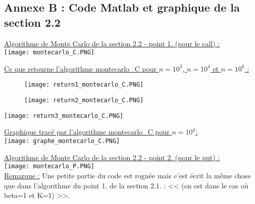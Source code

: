 \documentclass{article}
\theoremstyle{exostyle}
\begin{document}
\begin{appendices}

\setcounter{page}{1}
\section{Annexe B : Code Matlab et graphique de la section 2.2}

\bigbreak
\bigbreak

\hspace{-2.4cm}\underline{Algorithme de Monte Carlo de la section 2.2 - point 1. (pour le call) :}\\

\hspace{-2.5cm}\texttt{[image: montecarlo\_C.PNG]}

\newpage

\underline{Ce que retourne l'algorithme montecarlo\_C pour $n = 10^{3}$, $n = 10^{4}$ et $n = 10^{6}$ :}

\begin{figure}[h]
    \begin{minipage}[c]{.46\linewidth}
        \centering
        \texttt{[image: return1\_montecarlo\_C.PNG]}
    \end{minipage}
    \hfill
    \begin{minipage}[c]{.46\linewidth}
        \centering
        \texttt{[image: return2\_montecarlo\_C.PNG]}
    \end{minipage}
\end{figure}


\texttt{[image: return3\_montecarlo\_C.PNG]}

\newpage

\hspace{-1.7cm}\underline{Graphique tracé par l'algorithme montecarlo\_C pour $n=10^{4}$:}\\

\hspace{-1.7cm}\texttt{[image: graphe\_montecarlo\_C.PNG]}

\newpage

\hspace{-2.4cm}\underline{Algorithme de Monte Carlo de la section 2.2 - point 2. (pour le put) :}\\

\hspace{-2.5cm}\texttt{[image: montecarlo\_P.PNG]}\\


\hspace{-2.4cm}\underline{Remarque :} Une petite partie du code est rognée mais c'est écrit la même chose que dans l'algorithme du point 1. de la section 2.1. : << (on est dans le cas où beta=1 et K=1) >>.


\end{appendices}
\end{document}
